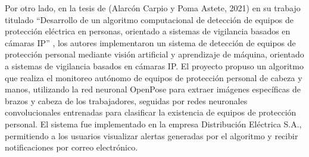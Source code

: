 Por otro lado, en la tesis de (Alarcón Carpio y Poma Astete, 2021) en su trabajo titulado “Desarrollo de un algoritmo computacional de detección de equipos de protección eléctrica en personas, orientado a sistemas de vigilancia basados en cámaras IP” \cite{pomadesarrollo}, los autores implementaron un sistema de detección de equipos de protección personal mediante visión artificial y aprendizaje de máquina, orientado a sistemas de vigilancia basados en cámaras IP. El proyecto propuso un algoritmo que realiza el monitoreo autónomo de equipos de protección personal de cabeza y manos, utilizando la red neuronal OpenPose para extraer imágenes específicas de brazos y cabeza de los trabajadores, seguidas por redes neuronales convolucionales entrenadas para clasificar la existencia de equipos de protección personal. El sistema fue implementado en la empresa Distribución Eléctrica S.A., permitiendo a los usuarios visualizar alertas generadas por el algoritmo y recibir notificaciones por correo electrónico.